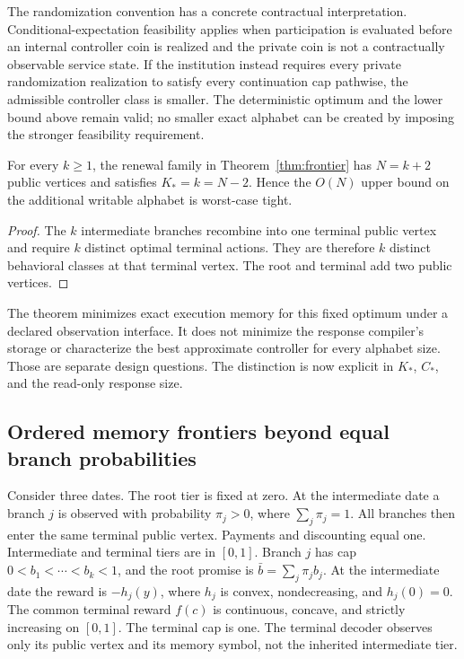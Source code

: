 The randomization convention has a concrete contractual interpretation. Conditional-expectation feasibility applies when participation is evaluated before an internal controller coin is realized and the private coin is not a contractually observable service state. If the institution instead requires every private randomization realization to satisfy every continuation cap pathwise, the admissible controller class is smaller. The deterministic optimum and the lower bound above remain valid; no smaller exact alphabet can be created by imposing the stronger feasibility requirement.

\begin{corollary}\label{cor:memory-tight}
For every $k\geq1$, the renewal family in Theorem~\ref{thm:frontier} has $N=k+2$ public vertices and satisfies $K_*=k=N-2$. Hence the $O(N)$ upper bound on the additional writable alphabet is worst-case tight.
\end{corollary}
\begin{proof}
The $k$ intermediate branches recombine into one terminal public vertex and require $k$ distinct optimal terminal actions. They are therefore $k$ distinct behavioral classes at that terminal vertex. The root and terminal add two public vertices.
\end{proof}

The theorem minimizes exact execution memory for this fixed optimum under a declared observation interface. It does not minimize the response compiler's storage or characterize the best approximate controller for every alphabet size. Those are separate design questions. The distinction is now explicit in $K_*$, $C_*$, and the read-only response size.

\subsection{Ordered memory frontiers beyond equal branch probabilities}
Consider three dates. The root tier is fixed at zero. At the intermediate date a branch $j$ is observed with probability $\pi_j>0$, where $\sum_j\pi_j=1$. All branches then enter the same terminal public vertex. Payments and discounting equal one. Intermediate and terminal tiers are in $[0,1]$. Branch $j$ has cap $0<b_1<\cdots<b_k<1$, and the root promise is $\bar b=\sum_j\pi_jb_j$. At the intermediate date the reward is $-h_j(y)$, where $h_j$ is convex, nondecreasing, and $h_j(0)=0$. The common terminal reward $f(c)$ is continuous, concave, and strictly increasing on $[0,1]$. The terminal cap is one. The terminal decoder observes only its public vertex and its memory symbol, not the inherited intermediate tier.

